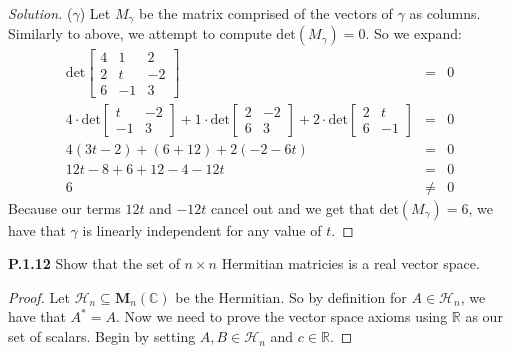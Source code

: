 \documentclass[12pt]{amsart}
\newenvironment{solution}
{\begin{proof}[Solution]}
{\end{proof}}
\begin{document}
\begin{onehalfspace}
\begin{solution}
            ($\gamma$) Let $M_\gamma$ be the matrix comprised of the vectors of $\gamma$ as columns. Similarly to above,
            we attempt to compute $\text{det}(M_\gamma) = 0$. So we expand:
            \begin{eqnarray*}
                \text{det}\left[\begin{matrix}
                                    4 & 1 & 2 \\
                                    2 & t & -2 \\
                                    6 & -1 & 3
                \end{matrix}\right] & = & 0 \\
                4\cdot\text{det}\left[\begin{matrix}
                                          t & -2\\
                                          -1 & 3
                \end{matrix}\right] +
                1\cdot\text{det}\left[\begin{matrix}
                                          2 & -2\\
                                          6 & 3
                \end{matrix}\right] +
                2\cdot\text{det}\left[\begin{matrix}
                                          2 & t\\
                                          6 & -1
                \end{matrix}\right] & = & 0\\
                4(3t - 2) + (6 + 12) + 2(-2 - 6t) & = & 0 \\
                12t - 8 + 6 + 12 - 4 - 12t & = & 0 \\
                6 & \neq & 0
            \end{eqnarray*}
            Because our terms $12t$ and $-12t$ cancel out and we get that $\text{det}(M_\gamma) = 6$, we have that
            $\gamma$ is linearly independent for any value of $t$.
        \end{solution}

        \noindent\textbf{P.1.12} Show that the set of $n\times n$ Hermitian matricies is a real vector space.
        \begin{proof}
            Let $\mathcal{H}_n\subseteq\mathbf{M}_n(\mathbb{C})$ be the Hermitian. So by definition for
            $A\in\mathcal{H}_n$, we have that $A^* = A$. Now we need to prove the vector space axioms using
            $\mathbb{R}$ as our set of scalars. Begin by setting $A,B\in\mathcal{H}_n$ and $c\in\mathbb{R}$.


\end{proof}
\end{onehalfspace}
\end{document}

